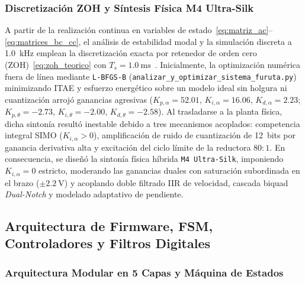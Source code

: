 \subsubsection{Discretización ZOH y Síntesis Física M4 Ultra-Silk}
A partir de la realización continua en variables de estado~\eqref{eq:matriz_ac}--\eqref{eq:matrices_bc_cc}, el análisis de estabilidad modal y la simulación discreta a \qty{1.0}{\kilo\hertz} emplean la discretización exacta por retenedor de orden cero (ZOH)~\eqref{eq:zoh_teorico} con $T_s=\qty{1.0}{\milli\second}$~\cite{Astrom1997,Franklin2015}. Inicialmente, la optimización numérica fuera de línea mediante \texttt{L-BFGS-B} (\texttt{analizar\_y\_optimizar\_\allowbreak sistema\_furuta.py}) minimizando ITAE y esfuerzo energético sobre un modelo ideal sin holgura ni cuantización arrojó ganancias agresivas ($K_{p,\alpha}=52.01$, $K_{i,\alpha}=16.06$, $K_{d,\alpha}=2.23$; $K_{p,\theta}=-2.73$, $K_{i,\theta}=-2.00$, $K_{d,\theta}=-2.58$). Al trasladarse a la planta física, dicha sintonía resultó inestable debido a tres mecanismos acoplados: competencia integral SIMO ($K_{i,\alpha}>0$), amplificación de ruido de cuantización de 12~bits por ganancia derivativa alta y excitación del ciclo límite de la reductora $80:1$. En consecuencia, se diseñó la sintonía física híbrida \texttt{M4 Ultra-Silk}, imponiendo $K_{i,\alpha}=0$ estricto, moderando las ganancias duales con saturación subordinada en el brazo ($\pm\qty{2.2}{\volt}$) y acoplando doble filtrado IIR de velocidad, cascada biquad \textit{Dual-Notch} y modelado adaptativo de pendiente.

\subsection{Arquitectura de Firmware, FSM, Controladores y Filtros Digitales}\label{subsec:firmware_control}

\subsubsection{Arquitectura Modular en 5 Capas y Máquina de Estados}




